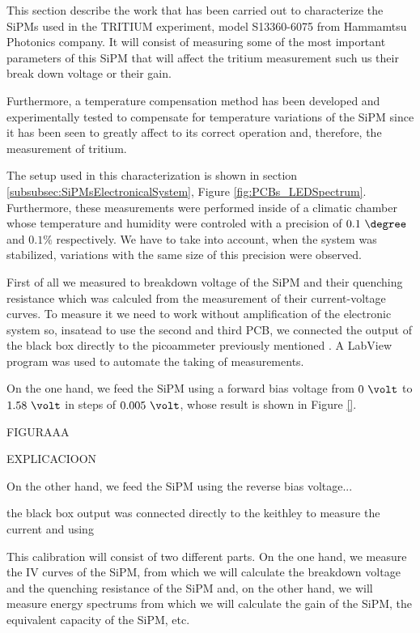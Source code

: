 This section describe the work that has been carried out to characterize the SiPMs used in the TRITIUM experiment, model S13360-6075 from Hammamtsu Photonics company. It will consist of measuring some of the most important parameters of this SiPM that will affect the tritium measurement such us their break down voltage or their gain.

Furthermore, a temperature compensation method has been developed and experimentally tested to compensate for temperature variations of the SiPM since it has been seen to greatly affect to its correct operation and, therefore, the measurement of tritium.

The setup used in this characterization is shown in section \ref{subsubsec:SiPMsElectronicalSystem}, Figure \ref{fig:PCBs_LEDSpectrum}. Furthermore, these measurements were performed inside of a climatic chamber whose temperature and humidity were controled with a precision of $0.1~\degree$ and $0.1\%$ respectively. We have to take into account, when the system was stabilized, variations with the same size of this precision were observed.

First of all we measured to breakdown voltage of the SiPM and their quenching resistance which was calculed from the measurement of their current-voltage curves. To measure it we need to work without amplification of the electronic system so, insatead to use the second and third PCB, we connected the output of the black box directly to the picoammeter previously mentioned \cite{DataSheetKeithley6487}. A LabView program was used to automate the taking of measurements.

On the one hand, we feed the SiPM using a forward bias voltage from $0~\volt$ to $1.58~\volt$ in steps of $0.005~\volt$, whose result is shown in Figure \ref{}.

FIGURAAA

EXPLICACIOON

On the other hand, we feed the SiPM using the reverse bias voltage...



the black box output was connected directly to the keithley to measure the current and using

This calibration will consist of two different parts. On the one hand, we measure the IV curves of the SiPM, from which we will calculate the breakdown voltage and the quenching resistance of the SiPM and, on the other hand, we will measure energy spectrums from which we will calculate the gain of the SiPM, the equivalent capacity of the SiPM, etc.

